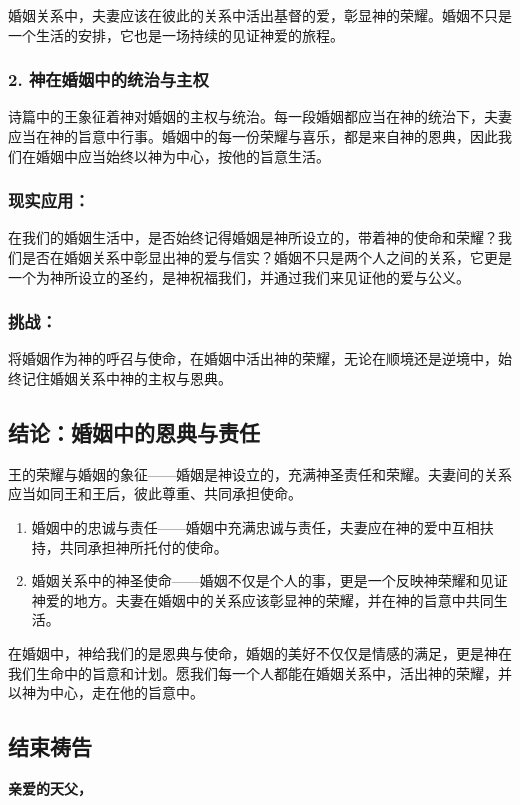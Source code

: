 \documentclass[a4paper, 12pt]{article}
\begin{document}
婚姻关系中，夫妻应该在彼此的关系中活出基督的爱，彰显神的荣耀。婚姻不只是一个生活的安排，它也是一场持续的见证神爱的旅程。
\subsubsection*{2. 神在婚姻中的统治与主权}
\hspace{0.6cm}诗篇中的王象征着神对婚姻的主权与统治。每一段婚姻都应当在神的统治下，夫妻应当在神的旨意中行事。婚姻中的每一份荣耀与喜乐，都是来自神的恩典，因此我们在婚姻中应当始终以神为中心，按他的旨意生活。
\subsubsection*{现实应用：}

在我们的婚姻生活中，是否始终记得婚姻是神所设立的，带着神的使命和荣耀？我们是否在婚姻关系中彰显出神的爱与信实？婚姻不只是两个人之间的关系，它更是一个为神所设立的圣约，是神祝福我们，并通过我们来见证他的爱与公义。
\subsubsection*{挑战：}

将婚姻作为神的呼召与使命，在婚姻中活出神的荣耀，无论在顺境还是逆境中，始终记住婚姻关系中神的主权与恩典。
\subsection*{结论：婚姻中的恩典与责任}
\hspace{0.6cm}王的荣耀与婚姻的象征——婚姻是神设立的，充满神圣责任和荣耀。夫妻间的关系应当如同王和王后，彼此尊重、共同承担使命。
\begin{enumerate}
    \item 婚姻中的忠诚与责任——婚姻中充满忠诚与责任，夫妻应在神的爱中互相扶持，共同承担神所托付的使命。

    \item 婚姻关系中的神圣使命——婚姻不仅是个人的事，更是一个反映神荣耀和见证神爱的地方。夫妻在婚姻中的关系应该彰显神的荣耀，并在神的旨意中共同生活。

\end{enumerate}

在婚姻中，神给我们的是恩典与使命，婚姻的美好不仅仅是情感的满足，更是神在我们生命中的旨意和计划。愿我们每一个人都能在婚姻关系中，活出神的荣耀，并以神为中心，走在他的旨意中。

\subsection*{结束祷告}
\textbf{亲爱的天父，}
\end{document}
